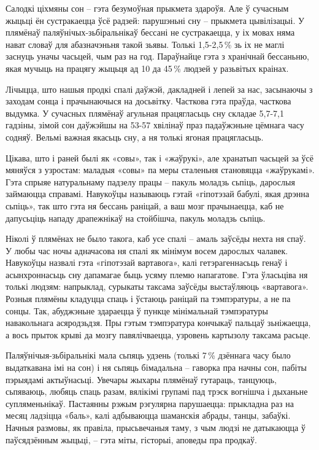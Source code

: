 Салодкі ціхмяны сон – гэта безумоўная прыкмета здароўя. Але ў сучасным жыцьці ён сустракаецца ўсё радзей: парушэньні сну – прыкмета цывілізацыі. У плямёнаў паляўнічых-зьбіральнікаў бессані не сустракаецца, у іх мовах няма нават словаў для абазначэньня такой зьявы. Толькі 1,5-2,5\,\% зь іх не маглі заснуць уначы часьцей, чым раз на год. Параўнайце гэта з хранічнай бессаньню, якая мучыць на працягу жыцьця ад 10 да 45\,\% людзей у разьвітых краінах.

Лічыцца, што нашыя продкі спалі даўжэй, дакладней і лепей за нас, засынаючы з заходам сонца і прачынаючыся на досьвітку. Часткова гэта праўда, часткова выдумка. У сучасных плямёнаў агульная працягласьць сну складае 5,7-7,1 гадзіны, зімой сон даўжэйшы на 53-57 хвілінаў праз падаўжэньне цёмнага часу содняў. Вельмі важная якасьць сну, а ня толькі ягоная працягласьць.

Цікава, што і раней былі як «совы», так і «жаўрукі», але хранатып часьцей за ўсё мяняўся з узростам: маладыя «совы» па меры сталеньня становяцца «жаўрукамі». Гэта спрыяе натуральнаму падзелу працы – пакуль моладзь сьпіць, дарослыя займаюцца справамі. Навукоўцы называюць гэтай «гіпотэзай бабулі, якая дрэнна сьпіць», так што гэта ня бессань раніцай, а ваш мозг прачынаецца, каб не дапусьціць нападу драпежнікаў на стойбішча, пакуль моладзь сьпіць.

Ніколі ў плямёнах не было такога, каб усе спалі – амаль заўсёды нехта ня спаў. У любы час ночы адначасова ня спалі як мінімум восем дарослых чалавек. Навукоўцы назвалі гэта «гіпотэзай вартавога», калі гетэрагеннасьць генаў і асынхроннасьць сну дапамагае быць усяму племю напагатове. Гэта ўласьціва ня толькі людзям: напрыклад, сурыкаты таксама заўсёды выстаўляюць «вартавога». Розныя плямёны кладуцца спаць і ўстаюць раніцай па тэмпэратуры, а не па сонцы. Так, абуджэньне здараецца ў пункце мінімальнай тэмпэратуры навакольнага асяродзьдзя. Пры гэтым тэмпэратура кончыкаў пальцаў зьніжаецца, а вось прыток крыві да мозгу павялічваецца, узровень картызолу таксама расьце.

Паляўнічыя-зьбіральнікі мала сьпяць удзень (толькі 7\,\% дзённага часу было выдаткавана імі на сон) і ня сьпяць бімадальна – гаворка пра начны сон, пабіты пэрыядамі актыўнасьці. Увечары жыхары плямёнаў гутараць, танцуюць, сьпяваюць, любяць спаць разам, вялікімі групамі пад трэск вогнішча і дыханьне супляменьнікаў. Пастаянны рэжым рэгулярна парушаецца: прыкладна раз на месяц ладзіцца «баль», калі адбываюцца шаманскія абрады, танцы, забаўкі. Начныя размовы, як правіла, прысьвечаныя таму, з чым людзі не датыкаюцца ў паўсядзённым жыцьці, – гэта міты, гісторыі, аповеды пра продкаў.

